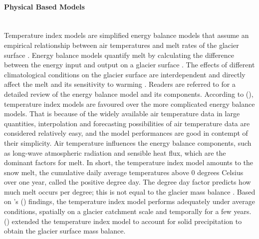 \paragraph{Physical Based Models}\mbox{}\vspace{2mm} \\
Temperature index models are simplified energy balance models that assume an empirical relationship between air temperatures and melt rates of the glacier surface \cite{hock-2003}. Energy balance models quantify melt by calculating the difference between the energy input and output on a glacier surface \cite{maussion2019oggm}. The effects of different climatological conditions on the glacier surface are interdependent and directly affect the melt and its sensitivity to warming \cite{cuffey-2010}. Readers are referred to \cite{cuffey-2010, van-den-broeke-2020} for a detailed review of the energy balance model and its components.  According to \citeauthor{hock-2003} (\citeyear{hock-2003}), temperature index models are favoured over the more complicated energy balance models. That is because of the widely available air temperature data in large quantities, interpolation and forecasting possibilities of air temperature data are considered relatively easy, and the model performances are good in contempt of their simplicity. Air temperature influences the energy balance components, such as long-wave atmospheric radiation and sensible heat flux, which are the dominant factors for melt. In short, the temperature index model amounts to the snow melt, the cumulative daily average temperatures above 0 degrees Celsius over one year, called the positive degree day. The degree day factor predicts how much melt occurs per degree; this is not equal to the glacier mass balance \cite{hock-2003, maussion2019oggm}. Based on \citeauthor{hock-2003}'s (\citeyear{hock-2003}) findings, the temperature index model performs adequately under average conditions, spatially on a glacier catchment scale and temporally for a few years. \citeauthor{marzeion-2012} (\citeyear{marzeion-2012}) extended the temperature index model to account for solid precipitation to obtain the glacier surface mass balance.  

